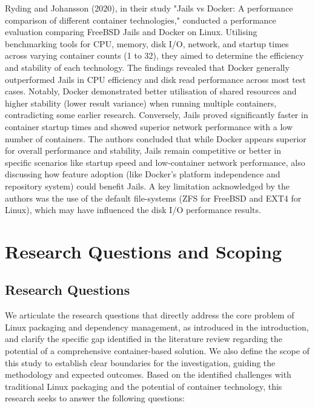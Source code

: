 \documentclass[journal,onecolumn]{IEEEtran}
\begin{document}
Ryding and Johansson (2020), in their study "Jails vs Docker: A performance comparison of different container technologies,"\cite{Ryding_Johansson_2020} conducted a performance evaluation comparing FreeBSD Jails and Docker on Linux. Utilising benchmarking tools for CPU, memory, disk I/O, network, and startup times across varying container counts (1 to 32), they aimed to determine the efficiency and stability of each technology. The findings revealed that Docker generally outperformed Jails in CPU efficiency and disk read performance across most test cases. Notably, Docker demonstrated better utilisation of shared resources and higher stability (lower result variance) when running multiple containers, contradicting some earlier research. Conversely, Jails proved significantly faster in container startup times and showed superior network performance with a low number of containers. The authors concluded that while Docker appears superior for overall performance and stability, Jails remain competitive or better in specific scenarios like startup speed and low-container network performance, also discussing how feature adoption (like Docker's platform independence and repository system) could benefit Jails. A key limitation acknowledged by the authors was the use of the default file-systems (ZFS for FreeBSD and EXT4 for Linux), which may have influenced the disk I/O performance results.

\newpage
\section{Research Questions and Scoping}
\subsection{Research Questions}
We articulate the research questions that directly address the core problem of Linux packaging and dependency management, as introduced in the introduction, and clarify the specific gap identified in the literature review regarding the potential of a comprehensive container-based solution. We also define the scope of this study to establish clear boundaries for the investigation, guiding the methodology and expected outcomes. Based on the identified challenges with traditional Linux packaging and the potential of container technology, this research seeks to answer the following questions:
\end{document}
